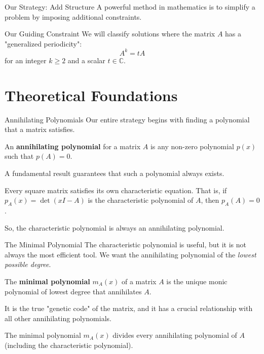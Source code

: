 \documentclass{beamer}
\begin{document}
\begin{frame}{Our Strategy: Add Structure}
  A powerful method in mathematics is to simplify a problem by imposing additional constraints.
  \vfill %
  \begin{alertblock}{Our Guiding Constraint}
  We will classify solutions where the matrix $A$ has a "generalized periodicity":
  \[ A^k = tA \]
    for an integer $k \ge 2$ and a scalar $t \in \mathbb{C}$.
  \end{alertblock}
\end{frame}

\section{Theoretical Foundations}

\begin{frame}{Annihilating Polynomials}
  Our entire strategy begins with finding a polynomial that a matrix satisfies.
  \begin{definition}
    An \textbf{annihilating polynomial} for a matrix $A$ is any non-zero polynomial $p(x)$ such that $p(A) = 0$.
  \end{definition}
  \vfill
  A fundamental result guarantees that such a polynomial always exists.
  \begin{theorem}
    Every square matrix satisfies its own characteristic equation. That is, if $p_A(x) = \det(xI - A)$ is the characteristic polynomial of $A$, then $p_A(A) = 0$.
  \end{theorem}
  \vfill
  So, the characteristic polynomial is always an annihilating polynomial.
\end{frame}

\begin{frame}{The Minimal Polynomial}
  The characteristic polynomial is useful, but it is not always the most efficient tool. We want the annihilating polynomial of the \textit{lowest possible degree}.
  \begin{definition}
    The \textbf{minimal polynomial} $m_A(x)$ of a matrix $A$ is the unique monic polynomial of lowest degree that annihilates $A$.
  \end{definition}
  \vfill
  It is the true "genetic code" of the matrix, and it has a crucial relationship with all other annihilating polynomials.
  \begin{theorem}
    The minimal polynomial $m_A(x)$ divides every annihilating polynomial of $A$ (including the characteristic polynomial).
  \end{theorem}
\end{frame}
\end{document}
